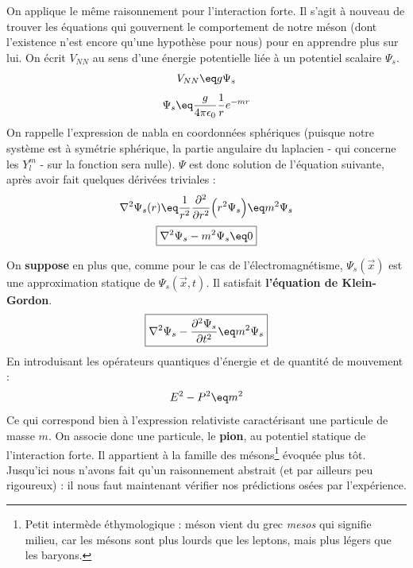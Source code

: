 On applique le même raisonnement pour l'interaction forte. Il s'agit à nouveau de trouver les équations qui gouvernent le comportement de notre méson (dont l'existence n'est encore qu'une hypothèse pour nous) pour en apprendre plus sur lui. On écrit $V_{NN}$ au sens d'une énergie potentielle liée à un potentiel scalaire $\Psi_s$.
\begin{equation*}
    V_{NN} \eq g\Psi_s
\end{equation*}
\begin{equation*}
    \Psi_s \eq \frac{g}{4\pi\epsilon_0}\frac{1}{r}e^{-mr}
\end{equation*}
On rappelle l'expression de nabla en coordonnées sphériques (puisque notre système est à symétrie sphérique, la partie angulaire du laplacien - qui concerne les $Y^m_l$ - sur la fonction sera nulle). $\Psi$ est donc solution de l'équation suivante, après avoir fait quelques dérivées triviales :
\begin{equation*}
    \nabla^2\Psi_s(r) 
    \eq \frac{1}{r^2}\dfrac{\partial^2}{\partial r^2}\Big(r^2 \Psi_s\Big)
    \eq m^2 \Psi_s
\end{equation*}
\begin{equation*}
    \boxed{
        \nabla^2 \Psi_s - m^2\Psi_s \eq 0
    }
\end{equation*}

On \textbf{suppose} en plus que, comme pour le cas de l'électromagnétisme, $\Psi_s(\Vec{x})$ est une approximation statique de $\Psi_s(\Vec{x},t)$. Il satisfait \textbf{l'équation de Klein-Gordon}.
\begin{equation*}
    \boxed{
        \nabla^2\Psi_s - \dfrac{\partial^2\Psi_s}{\partial t^2} \eq m^2 \Psi_s
    }
\end{equation*}
En introduisant les opérateurs quantiques d'énergie et de quantité de mouvement :
\begin{equation*}
    E^2 - P^2 \eq m^2
\end{equation*}
Ce qui correspond bien à l'expression relativiste caractérisant une particule de masse $m$. On associe donc une particule, le \textbf{pion}, au potentiel statique de l'interaction forte. Il appartient à la famille des mésons\footnote{Petit intermède éthymologique : méson vient du grec \emph{mesos} qui signifie milieu, car les mésons sont plus lourds que les leptons, mais plus légers que les baryons.} évoquée plus tôt. Jusqu'ici nous n'avons fait qu'un raisonnement abstrait (et par ailleurs peu rigoureux) : il nous faut maintenant vérifier nos prédictions osées par l'expérience.\\



